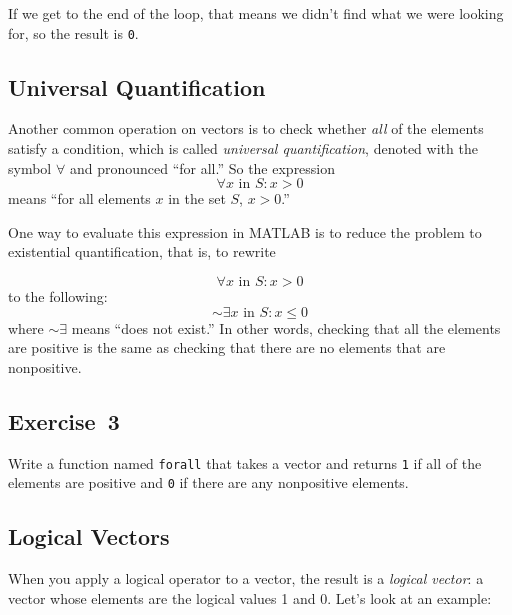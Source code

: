 
If we get to the end of the loop, that means we didn't find what
we were looking for, so the result is \lstinline{0}.

\subsection{Universal Quantification}


Another common operation on vectors is to check whether \emph{all}
of the elements satisfy a condition, which is called \emph{universal quantification}, denoted with
the symbol $\forall$ and pronounced ``for all.''  So the expression %
%
\[ \forall x \mbox{~in~} S: x>0 \]
%
means ``for all elements $x$ in the set $S$, $x>0$.''

One way to evaluate this expression in MATLAB is to reduce the problem to
existential quantification, that is, to rewrite

\begin{equation*}
\forall x \mbox{~in~} S: x>0
\end{equation*}
to the following:
\begin{equation*}
{\sim} \exists x \mbox{~in~} S: x \le 0
\end{equation*}
where ${\sim} \exists$ means ``does not exist.''
In other words, checking that all the \linebreak elements are positive is
the same as checking that there are no elements
that are nonpositive.

\subsection{Exercise~3}
Write a function named \lstinline{forall} that
takes a vector and returns \lstinline{1} if all of the elements are positive
and \lstinline{0} if there are any nonpositive elements.





\subsection{Logical Vectors}

When you apply a logical operator to a vector, the result is a 
\emph{logical vector}: a vector whose elements are the logical
values 1 and 0. Let's look at an \linebreak example:

